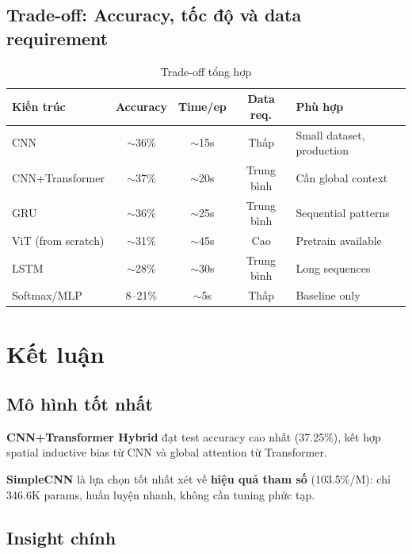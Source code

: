 \documentclass[12pt, a4paper]{article}
\begin{document}
\subsection{Trade-off: Accuracy, tốc độ và data requirement}

\begin{table}[H]
\centering
\caption{Trade-off tổng hợp}
\begin{tabular}{lcccl}
\toprule
\textbf{Kiến trúc} & \textbf{Accuracy} & \textbf{Time/ep} & \textbf{Data req.} & \textbf{Phù hợp} \\
\midrule
CNN                 & $\sim$36\% & $\sim$15s & Thấp     & Small dataset, production \\
CNN+Transformer     & $\sim$37\% & $\sim$20s & Trung bình & Cần global context \\
GRU                 & $\sim$36\% & $\sim$25s & Trung bình & Sequential patterns \\
ViT (from scratch)  & $\sim$31\% & $\sim$45s & Cao       & Pretrain available \\
LSTM                & $\sim$28\% & $\sim$30s & Trung bình & Long sequences \\
Softmax/MLP         & 8--21\%   & $\sim$5s  & Thấp      & Baseline only \\
\bottomrule
\end{tabular}
\end{table}

\section{Kết luận}

\subsection{Mô hình tốt nhất}

\textbf{CNN+Transformer Hybrid} đạt test accuracy cao nhất (37.25\%), kết hợp spatial inductive bias từ CNN và global attention từ Transformer.

\textbf{SimpleCNN} là lựa chọn tốt nhất xét về \textbf{hiệu quả tham số} (103.5\%/M): chỉ 346.6K params, huấn luyện nhanh, không cần tuning phức tạp.

\subsection{Insight chính}
\end{document}
